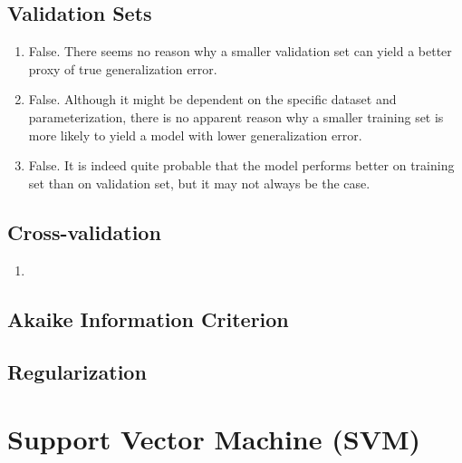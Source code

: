 \documentclass[a4paper, 10pt]{article}
\begin{document}
\subsection{Validation Sets}
\begin{enumerate}[label=(\alph*)]
    \item False. There seems no reason why a smaller validation set can yield a better proxy of true generalization error.
    \item False. Although it might be dependent on the specific dataset and parameterization, there is no apparent reason why a smaller training set is more likely to yield a model with lower generalization error.
    \item False. It is indeed quite probable that the model performs better on training set than on validation set, but it may not always be the case.
\end{enumerate}

\subsection{Cross-validation}
\begin{enumerate}[label=(\alph*)]
    \item 
\end{enumerate}

\subsection{Akaike Information Criterion}

\subsection{Regularization}

\clearpage

\section{Support Vector Machine (SVM)}
\end{document}
